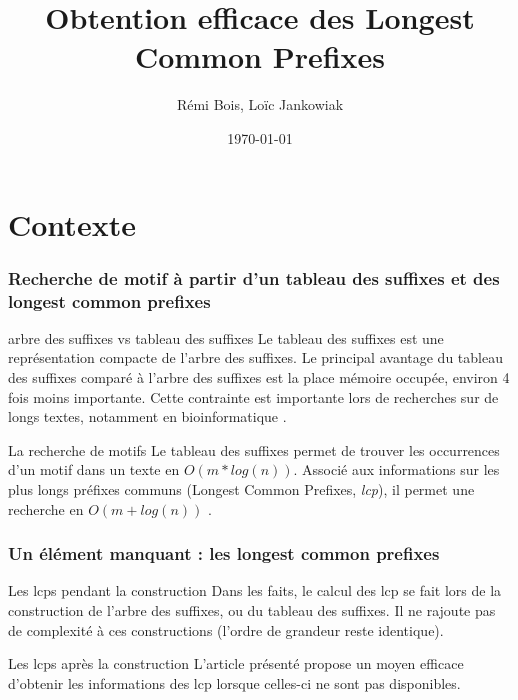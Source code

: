 \documentclass[10pt]{beamer}
\title{Obtention efficace des Longest Common Prefixes}
\author{Rémi Bois, Loïc Jankowiak}
\date{\today}
\begin{document}
\begin{frame}
  \maketitle

\end{frame}

\begin{frame}
  \tableofcontents
\end{frame}

\section{Contexte}
\label{sec:context}


\begin{frame}
  \frametitle{Recherche de motif à partir d'un tableau des suffixes
    et des longest common prefixes}

  \begin{block}{arbre des suffixes vs tableau des suffixes} 
    Le tableau des suffixes est une représentation compacte de l'arbre
    des suffixes. Le principal avantage du tableau des suffixes comparé à
    l'arbre des suffixes est la place mémoire occupée, environ 4 fois
    moins importante. Cette contrainte est importante lors de
    recherches sur de longs textes, notamment en bioinformatique \cite{Raffinot11}.
  \end{block}

  \pause

  \begin{block}{La recherche de motifs}
    Le tableau des suffixes permet de trouver les occurrences d'un
    motif dans un texte en $O(m*log(n))$. Associé aux informations sur
    les plus longs préfixes communs (Longest Common Prefixes,
    \emph{lcp}), il permet une recherche en $O(m + log(n))$ \cite{Manber93}.
  \end{block}
  
\end{frame}

\begin{frame}
  \frametitle{Un élément manquant : les longest common prefixes}

  \begin{block}{Les lcps pendant la construction}
      Dans les faits, le calcul des lcp se fait lors de la construction de
      l'arbre des suffixes, ou du tableau des suffixes. Il ne rajoute pas
      de complexité à ces constructions (l'ordre de grandeur reste
      identique).
  \end{block}
  \pause
  \begin{block}{Les lcps après la construction}
    L'article présenté propose un moyen efficace d'obtenir
    les informations des lcp lorsque celles-ci ne sont pas
    disponibles\cite{Kasai01}.
  \end{block}

\end{frame}
\end{document}
